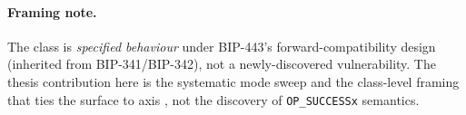 \paragraph{Framing note.}
The class is \emph{specified behaviour} under BIP-443's
forward-compatibility design (inherited from BIP-341/BIP-342), not a
newly-discovered vulnerability. The thesis contribution here is the
systematic mode sweep and the class-level framing that ties the
surface to axis \axopsurf{}, not the discovery of
\texttt{OP\_SUCCESSx} semantics.
